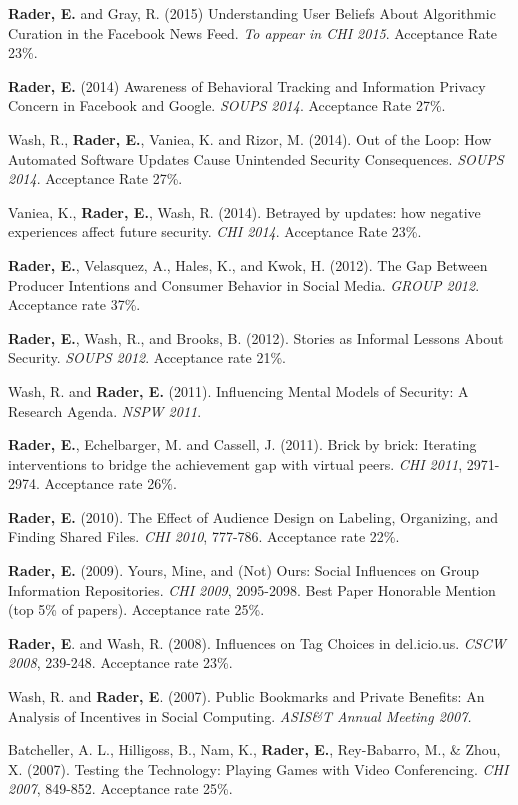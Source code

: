 \documentclass[9pt]{extarticle}
\begin{document}
\textbf{Rader, E.} and Gray, R. (2015) Understanding User Beliefs About Algorithmic Curation in the Facebook News Feed. \emph{To appear in CHI 2015}. Acceptance Rate 23\%.

\textbf{Rader, E.} (2014) Awareness of Behavioral Tracking and Information Privacy Concern in Facebook and Google. \emph{SOUPS 2014}. Acceptance Rate 27\%.

Wash, R., \textbf{Rader, E.}, Vaniea, K. and Rizor, M. (2014). Out of the Loop: How Automated Software Updates Cause Unintended Security Consequences. \emph{SOUPS 2014}. Acceptance Rate 27\%.

Vaniea, K., \textbf{Rader, E.}, Wash, R. (2014). Betrayed by updates: how negative experiences affect future security. \emph{CHI 2014}. Acceptance Rate 23\%.

\textbf{Rader, E.}, Velasquez, A., Hales, K., and Kwok, H. (2012). The Gap Between Producer Intentions and Consumer Behavior in Social Media. \emph{GROUP 2012}. Acceptance rate 37\%.

\textbf{Rader, E.}, Wash, R., and Brooks, B. (2012). Stories as Informal Lessons About Security. \emph{SOUPS 2012}. Acceptance rate 21\%.

Wash, R. and \textbf{Rader, E.} (2011). Influencing Mental Models of Security: A Research Agenda. \emph{NSPW 2011}.

\textbf{Rader, E.}, Echelbarger, M. and Cassell, J. (2011). Brick by brick: Iterating interventions to bridge the achievement gap with virtual peers. \emph{CHI 2011}, 2971-2974. Acceptance rate 26\%.

\textbf{Rader, E.} (2010). The Effect of Audience Design on Labeling, Organizing, and Finding Shared Files. \emph{CHI 2010}, 777-786. Acceptance rate 22\%.

\textbf{Rader, E.} (2009). Yours, Mine, and (Not) Ours: Social Influences on Group Information Repositories. \emph{CHI 2009}, 2095-2098. Best Paper Honorable Mention (top 5\% of papers). Acceptance rate 25\%.

\textbf{Rader, E}. and Wash, R. (2008). Influences on Tag Choices in del.icio.us. \emph{CSCW 2008}, 239-248. Acceptance rate 23\%.

Wash, R. and \textbf{Rader, E}. (2007). Public Bookmarks and Private Benefits: An Analysis of Incentives in Social Computing. \emph{ASIS\&T Annual Meeting 2007.}

Batcheller, A. L., Hilligoss, B., Nam, K., \textbf{Rader, E.}, Rey-Babarro, M., \& Zhou, X. (2007). Testing the Technology: Playing Games with Video Conferencing. \emph{CHI 2007}, 849-852. Acceptance rate 25\%. 
\end{document}
